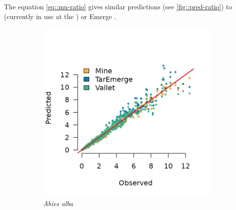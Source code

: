 The equation \eqref{eq::mu-ratio} gives similar predictions (see \ref{fig::pred-ratio}) to \cite{Vallet2006} (currently in use at the \NFI) or Emerge \parencite[allometry not used officially by the French \NFI]{Deleuze2014}.

\begin{figure}[htb]
	\centering
	\begin{subfigure}{0.4\textwidth}
		\includegraphics{./Figures/abiesAlba-pred.png}
		\caption{\textit{Abies alba}}
	\end{subfigure}
	\hfil
	\begin{subfigure}{0.4\textwidth}

\end{subfigure}
\end{figure}
